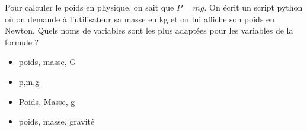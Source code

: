 \begin{Quizz}
    Pour calculer le poids en physique, on sait que $P=mg$. On écrit un script python où on demande à l'utilisateur sa masse en kg et on lui affiche son poids en Newton. Quels noms de variables sont les plus adaptées pour les variables de la formule ?
    \begin{itemize}
    \renewcommand{\labelitemi}{$\square$}
    \item poids, masse, G
    \item p,m,g
    \item Poids, Masse, g
    \item poids, masse, gravité
    \end{itemize}
\end{Quizz}


